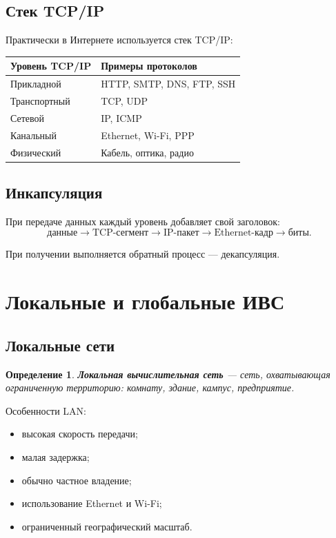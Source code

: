 \documentclass[12pt,a4paper]{article}
\newtheorem{definition}{Определение}
\begin{document}
\subsection{Стек TCP/IP}

Практически в Интернете используется стек TCP/IP:

\begin{center}
\begin{tabular}{ll}
\toprule
Уровень TCP/IP & Примеры протоколов \\
\midrule
Прикладной & HTTP, SMTP, DNS, FTP, SSH \\
Транспортный & TCP, UDP \\
Сетевой & IP, ICMP \\
Канальный & Ethernet, Wi-Fi, PPP \\
Физический & Кабель, оптика, радио \\
\bottomrule
\end{tabular}
\end{center}

\subsection{Инкапсуляция}

При передаче данных каждый уровень добавляет свой заголовок:
\[
\text{данные}
\rightarrow
\text{TCP-сегмент}
\rightarrow
\text{IP-пакет}
\rightarrow
\text{Ethernet-кадр}
\rightarrow
\text{биты}.
\]

При получении выполняется обратный процесс --- декапсуляция.

\section{Локальные и глобальные ИВС}

\subsection{Локальные сети}

\begin{definition}
\textbf{Локальная вычислительная сеть} --- сеть, охватывающая ограниченную территорию: комнату, здание, кампус, предприятие.
\end{definition}

Особенности LAN:
\begin{itemize}
    \item высокая скорость передачи;
    \item малая задержка;
    \item обычно частное владение;
    \item использование Ethernet и Wi-Fi;
    \item ограниченный географический масштаб.
\end{itemize}
\end{document}

